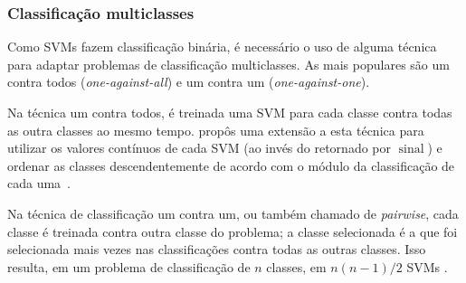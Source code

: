 \subsubsection{Classificação multiclasses}\label{sec:svmmulti}


Como SVMs fazem classificação binária, é necessário o uso de alguma técnica para adaptar problemas de classificação multiclasses. As mais populares são um contra todos (\emph{one-against-all}) e um contra um (\emph{one-against-one}).

Na técnica um contra todos, é treinada uma SVM para cada classe contra todas as outra classes ao mesmo tempo.  propôs uma extensão a esta técnica para utilizar os valores contínuos de cada SVM (ao invés do retornado por $\operatorname{sinal}$) e ordenar as classes descendentemente de acordo com o módulo da classificação de cada uma~\cite{abe2003analysis}.

Na técnica de classificação um contra um, ou também chamado de \emph{pairwise}, cada classe é treinada contra outra classe do problema; a classe selecionada é a que foi selecionada mais vezes nas classificações contra todas as outras classes. Isso resulta, em um problema de classificação de $n$ classes, em $n(n - 1)/2$ SVMs \cite{kressel1999pairwise}.




